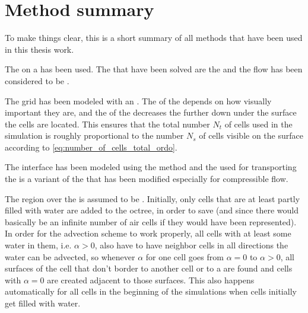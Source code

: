 \chapter{Method summary}
\label{chap:methodsummary}

To make things clear, this is a short summary of all methods that have been used in this thesis work.

The \FVM on a  has been used. The \PDEs that have been solved are the  and the flow has been considered to be .

The grid has been modeled with an \octree. The \LOD of the  depends on how visually important they are, and the \LOD of the  decreases the further down under the surface the cells are located. This ensures that the total number $N_t$ of cells used in the simulation is roughly proportional to the number $N_s$ of cells visible on the surface according to \eqref{eq:number_of_cells_total_ordo}.

The interface has been modeled using the \VOF method and the  used for transporting the  is a variant of the  that has been modified especially for compressible flow.

The region over the  is assumed to be \air. Initially, only cells that are at least partly filled with water are added to the octree, in order to save  (and since there would basically be an infinite number of air cells if they would have been represented). In order for the advection scheme to work properly, all cells with at least some water in them, i.e. $\alpha > 0$, also have to have neighbor cells in all directions the water can be advected, so whenever $\alpha$ for one cell goes from $\alpha = 0$ to $\alpha > 0$, all surfaces of the cell that don't border to another cell or to a  are found and cells with $\alpha = 0$ are created adjacent to those surfaces. This also happens automatically for all cells in the beginning of the simulations when cells initially get filled with water.
